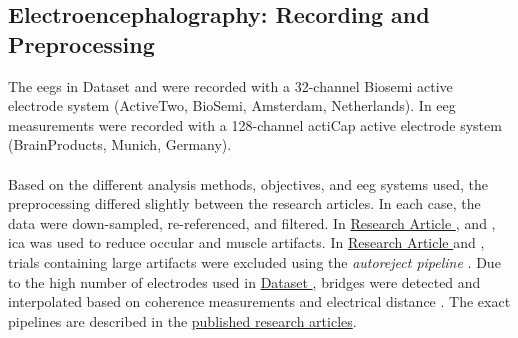 \subsection{Electroencephalography: Recording and Preprocessing}
The \glspl{eeg} in Dataset  and  were recorded with a 32-channel Biosemi active electrode system (ActiveTwo, BioSemi, Amsterdam, Netherlands). In  \gls{eeg} measurements were recorded with a 128-channel actiCap active electrode system (BrainProducts, Munich, Germany).\\
\\
Based on the different analysis methods, objectives, and \gls{eeg} systems used, the preprocessing differed slightly between the research articles. In each case, the data were down-sampled, re-referenced, and filtered. In \hyperref[results:paperI]{Research Article }, \hyperref[results:paperIII]{} and \hyperref[results:paperIV]{}, \gls{ica} was used to reduce occular and muscle artifacts. In \hyperref[results:paperI]{Research Article } and \hyperref[results:paperIV]{}, trials containing large artifacts were excluded using the \textit{autoreject pipeline} \cite{Jas2017}. Due to the high number of electrodes used in \hyperref[methods:datasets:III]{Dataset }, bridges were detected and interpolated based on coherence measurements and electrical distance \cite{Alschuler2014}. The exact pipelines are described in the \hyperref[pub:papers]{published research articles}.  

